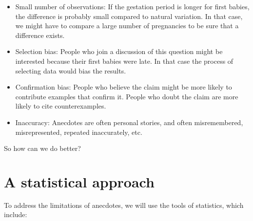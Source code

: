 \documentclass[12pt]{book}
\begin{document}
\begin{itemize}

\item Small number of observations: If the gestation period is longer
  for first babies, the difference is probably small compared to
  natural variation.  In that case, we might have to compare a large
  number of pregnancies to be sure that a difference exists.

\item Selection bias: People who join a discussion of this question
  might be interested because their first babies were late.  In that
  case the process of selecting data would bias the results.

\item Confirmation bias:  People who believe the claim might be more
  likely to contribute examples that confirm it.  People who doubt the
  claim are more likely to cite counterexamples.

\item Inaccuracy: Anecdotes are often personal stories, and often
  misremembered, misrepresented, repeated
  inaccurately, etc.

\end{itemize}

So how can we do better?

\section{A statistical approach}

To address the limitations of anecdotes, we will use the tools
of statistics, which include:
\end{document}
